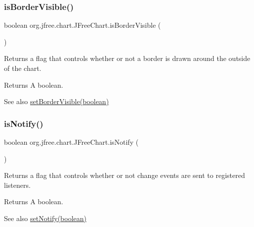 \subsubsection{\texorpdfstring{is\+Border\+Visible()}{isBorderVisible()}}
{\footnotesize\ttfamily boolean org.\+jfree.\+chart.\+J\+Free\+Chart.\+is\+Border\+Visible (\begin{DoxyParamCaption}{ }\end{DoxyParamCaption})}

Returns a flag that controls whether or not a border is drawn around the outside of the chart.

\begin{DoxyReturn}{Returns}
A boolean.
\end{DoxyReturn}
\begin{DoxySeeAlso}{See also}
\mbox{\hyperlink{classorg_1_1jfree_1_1chart_1_1_j_free_chart_a5c51189211b4cff88055842e15527453}{set\+Border\+Visible(boolean)}} 
\end{DoxySeeAlso}
\mbox{\label{classorg_1_1jfree_1_1chart_1_1_j_free_chart_ab3f7b1bca87ea773fab5f224aa25c989}} 
\subsubsection{\texorpdfstring{is\+Notify()}{isNotify()}}
{\footnotesize\ttfamily boolean org.\+jfree.\+chart.\+J\+Free\+Chart.\+is\+Notify (\begin{DoxyParamCaption}{ }\end{DoxyParamCaption})}

Returns a flag that controls whether or not change events are sent to registered listeners.

\begin{DoxyReturn}{Returns}
A boolean.
\end{DoxyReturn}
\begin{DoxySeeAlso}{See also}
\mbox{\hyperlink{classorg_1_1jfree_1_1chart_1_1_j_free_chart_a7756201ec1d421db8880a1c243d2f6f9}{set\+Notify(boolean)}} 
\end{DoxySeeAlso}
\mbox{\label{classorg_1_1jfree_1_1chart_1_1_j_free_chart_ac46407da050d903d0d03ba9f9137623d}} 
